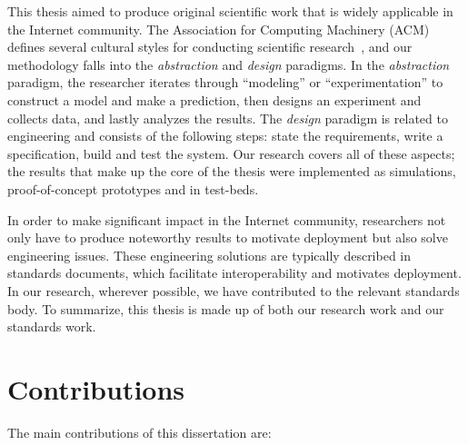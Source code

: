 This thesis aimed to produce original scientific work that is widely
applicable in the Internet community. The Association for Computing Machinery
(ACM) defines several cultural styles for conducting scientific
research~\cite{Denning:CS.Method}, and our methodology falls into the
\textit{abstraction} and \textit{design} paradigms. In the \emph{abstraction}
paradigm, the researcher iterates through ``modeling'' or ``experimentation''
to construct a model and make a prediction, then designs an experiment and
collects data, and lastly analyzes the results. The \emph{design} paradigm is
related to  engineering and consists of the following steps: state the
requirements, write a specification, build and test the system. Our research
covers all of these aspects; the results that make up the core of the thesis
were implemented as simulations, proof-of-concept prototypes and in test-beds. 

In order to make significant impact in the Internet community, researchers not
only have to produce noteworthy results to motivate deployment but also solve
engineering issues. These engineering solutions are typically
described in standards documents, which facilitate interoperability and
motivates deployment. In our research, wherever possible, we have contributed
to the relevant standards body. To summarize, this thesis is made up
of both our research work and our standards work.


\section{Contributions}

The main contributions of this dissertation are:

